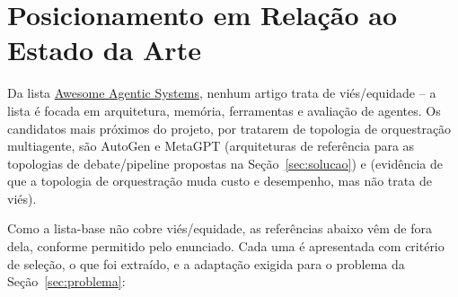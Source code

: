 \documentclass[12pt]{article}
\begin{document}
\section{Posicionamento em Relação ao Estado da Arte}
\label{sec:estado_da_arte}

Da lista \href{https://juliodosreis.com/awesome-agenticsystems/}{Awesome Agentic Systems}, nenhum artigo trata de viés/equidade -- a lista é focada em arquitetura, memória, ferramentas e avaliação de agentes. Os candidatos mais próximos do projeto, por tratarem de topologia de orquestração multiagente, são AutoGen e MetaGPT (arquiteturas de referência para as topologias de debate/pipeline propostas na Seção~\ref{sec:solucao}) e \citet{sayedali2026harness} (evidência de que a topologia de orquestração muda custo e desempenho, mas não trata de viés).

Como a lista-base não cobre viés/equidade, as referências abaixo vêm de fora dela, conforme permitido pelo enunciado. Cada uma é apresentada com critério de seleção, o que foi extraído, e a adaptação exigida para o problema da Seção~\ref{sec:problema}:
\end{document}
